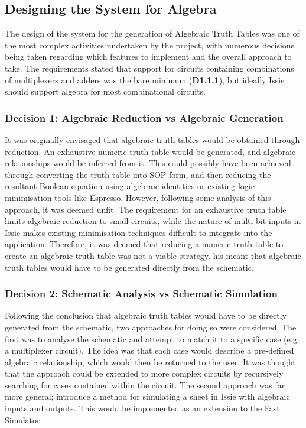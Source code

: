 \subsection{Designing the System for Algebra}
The design of the system for the generation of Algebraic Truth Tables was one of the most complex activities undertaken by the project, with numerous decisions being taken regarding which features to implement and the overall approach to take. The requirements stated that support for circuits containing combinations of multiplexers and adders was the bare minimum (\textbf{D1.1.1}), but ideally Issie should support algebra for most combinational circuits.

\subsubsection{Decision 1: Algebraic Reduction vs Algebraic Generation}
It was originally envisaged that algebraic truth tables would be obtained through reduction. An exhaustive numeric truth table would be generated, and algebraic relationships would be inferred from it. This could possibly have been achieved through converting the truth table into SOP form, and then reducing the resultant Boolean equation using algebraic identities or existing logic minimisation tools like Espresso. However, following some analysis of this approach, it was deemed unfit. The requirement for an exhaustive truth table limits algebraic reduction to small circuits, while the nature of multi-bit inputs in Issie makes existing  minimisation techniques difficult to integrate into the application. Therefore, it was deemed that reducing a numeric truth table to create an algebraic truth table was not a viable strategy. his meant that algebraic truth tables would have to be generated directly from the schematic.

\subsubsection{Decision 2: Schematic Analysis vs Schematic Simulation}
Following the conclusion that algebraic truth tables would have to be directly generated from the schematic, two approaches for doing so were considered. The first was to analyse the schematic and attempt to match it to a specific case (e.g. a multiplexer circuit). The idea was that each case would describe a pre-defined algebraic relationship, which would then be returned to the user. It was thought that the approach could be extended to more complex circuits by recursively searching for cases contained within the circuit. 
The second approach was far more general; introduce a method for simulating a sheet in Issie with algebraic inputs and outputs. This would be implemented as an extension to the Fast Simulator.

